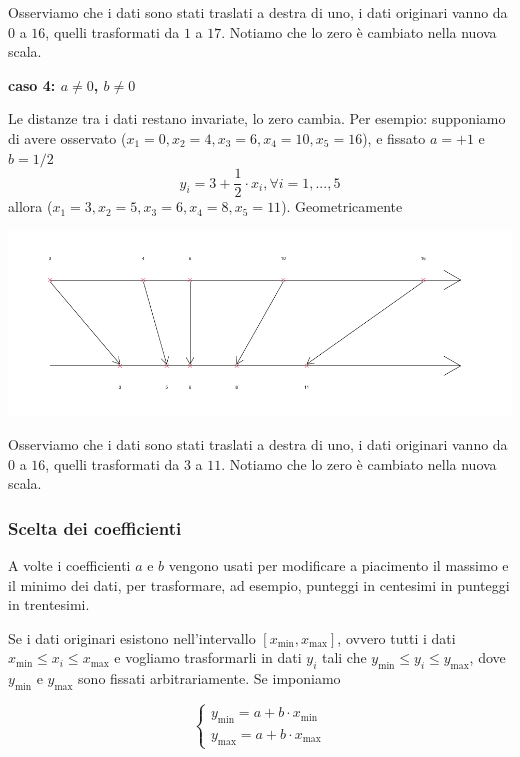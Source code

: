 \documentclass[
  11pt,
]{book}
\theoremstyle{mytheoremstyle}
\theoremstyle{mydefstyle}
\begin{document}
Osserviamo che i dati sono stati traslati a destra di uno, i dati originari vanno da \(0\) a \(16\), quelli trasformati da \(1\) a \(17\). Notiamo che lo zero è cambiato nella nuova scala.

\textbf{caso 4: \(a\ne 0\), \(b\ne 0\)}

Le distanze tra i dati restano invariate, lo zero cambia.
Per esempio: supponiamo di avere osservato (\(x_1=0, x_2=4, x_3=6, x_4=10, x_5=16\)), e fissato \(a=+1\) e \(b=1/2\)
\[
y_i= 3 + \frac 12 \cdot x_i, \forall i = 1,...,5
\]
allora (\(x_1=3, x_2=5, x_3=6, x_4=8, x_5=11\)). Geometricamente

\begin{center}\includegraphics{Appunti_di_Statistica_2025_files/figure-latex/tranf-lin-gr4-1} \end{center}

Osserviamo che i dati sono stati traslati a destra di uno, i dati originari vanno da \(0\) a \(16\), quelli trasformati da \(3\) a \(11\). Notiamo che lo zero è cambiato nella nuova scala.

\subsubsection{Scelta dei coefficienti}\label{scelta-dei-coefficienti}

A volte i coefficienti \(a\) e \(b\) vengono usati per modificare a piacimento il massimo e il minimo dei dati,
per trasformare, ad esempio, punteggi in centesimi in punteggi in trentesimi.

Se i dati originari esistono nell'intervallo \([x_{\min},x_{\max}]\), ovvero tutti i dati \(x_{\min}\le x_i\le x_{\max}\)
e vogliamo trasformarli in dati \(y_i\) tali che \(y_{\min}\le y_i\le y_{\max}\), dove \(y_{\min}\) e \(y_{\max}\) sono fissati arbitrariamente. Se imponiamo

\[
\begin{cases}
y_{\text{min}} = a + b \cdot x_{\text{min}} \\
y_{\text{max}} = a + b \cdot x_{\text{max}}
\end{cases}
\]
\end{document}

